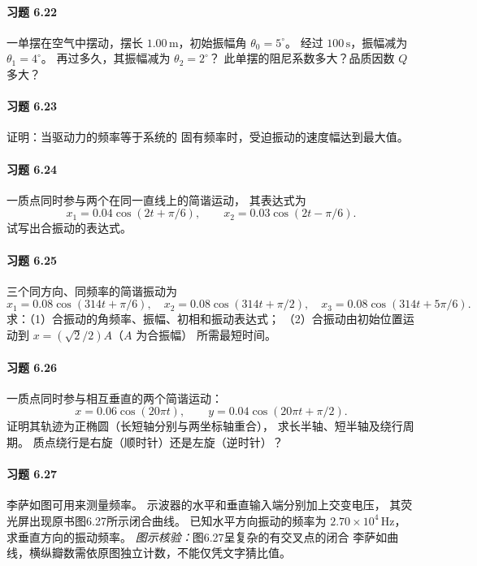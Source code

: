 \paragraph{习题 6.22}
一单摆在空气中摆动，摆长
\(1.00\,\mathrm m\)，初始振幅角
\(\theta_0=5^\circ\)。
经过 \(100\,\mathrm s\)，振幅减为
\(\theta_1=4^\circ\)。
再过多久，其振幅减为
\(\theta_2=2^\circ\)？
此单摆的阻尼系数多大？品质因数 \(Q\) 多大？

\paragraph{习题 6.23}
证明：当驱动力的频率等于系统的
固有频率时，受迫振动的速度幅达到最大值。

\paragraph{习题 6.24}
一质点同时参与两个在同一直线上的简谐运动，
其表达式为
\[
 x_1=0.04\cos(2t+\pi/6),\qquad
 x_2=0.03\cos(2t-\pi/6).
\]
试写出合振动的表达式。

\paragraph{习题 6.25}
三个同方向、同频率的简谐振动为
\[
 x_1=0.08\cos(314t+\pi/6),\quad
 x_2=0.08\cos(314t+\pi/2),\quad
 x_3=0.08\cos(314t+5\pi/6).
\]
求：（1）合振动的角频率、振幅、初相和振动表达式；
（2）合振动由初始位置运动到
\(x=(\sqrt2/2)A\)（\(A\) 为合振幅）
所需最短时间。

\paragraph{习题 6.26}
一质点同时参与相互垂直的两个简谐运动：
\[
 x=0.06\cos(20\pi t),\qquad
 y=0.04\cos(20\pi t+\pi/2).
\]
证明其轨迹为正椭圆（长短轴分别与两坐标轴重合），
求长半轴、短半轴及绕行周期。
质点绕行是右旋（顺时针）还是左旋（逆时针）？

\paragraph{习题 6.27}
李萨如图可用来测量频率。
示波器的水平和垂直输入端分别加上交变电压，
其荧光屏出现原书图6.27所示闭合曲线。
已知水平方向振动的频率为
\(2.70\times10^4\,\mathrm{Hz}\)，
求垂直方向的振动频率。
\textit{图示核验：}图6.27呈复杂的有交叉点的闭合
李萨如曲线，横纵瓣数需依原图独立计数，不能仅凭文字猜比值。
